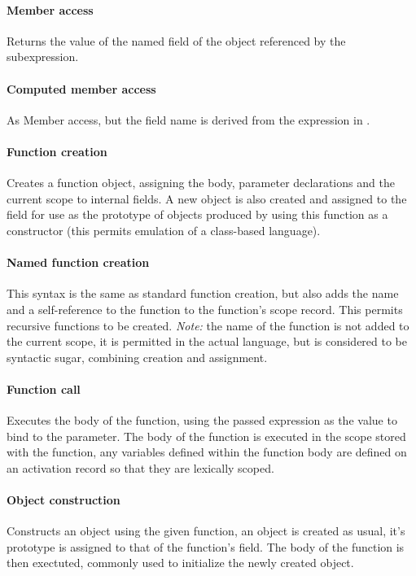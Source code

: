 \documentclass[a4paper]{article}
\begin{document}
\paragraph{Member access} Returns the value of the named field of the object referenced by
the subexpression.

\paragraph{Computed member access} As Member access, but the field name is derived from
the expression in \js{[]}.

\paragraph{Function creation} Creates a function object, assigning the body, parameter
declarations and the current scope to internal fields. A new object is also
created and assigned to the  field for use as the prototype of
objects produced by using this function as a constructor (this permits
emulation of a class-based language).

\paragraph{Named function creation} This syntax is the same as standard function creation,
but also adds the name and a self-reference to the function to the function's
scope record. This permits recursive functions to be created. \emph{Note:} the
name of the function is not added to the current scope, it is permitted in the
actual language, but is considered to be syntactic sugar, combining creation and
assignment.

\paragraph{Function call} Executes the body of the function, using the passed expression
as the value to bind to the parameter. The body of the function is executed in
the scope stored with the function, any variables defined within the function
body are defined on an activation record so that they are lexically scoped.

\paragraph{Object construction} Constructs an object using the given function, an object
is created as usual, it's prototype is assigned to that of the function's
 field. The body of the function is then exectuted, commonly used
to initialize the newly created object.
\end{document}
